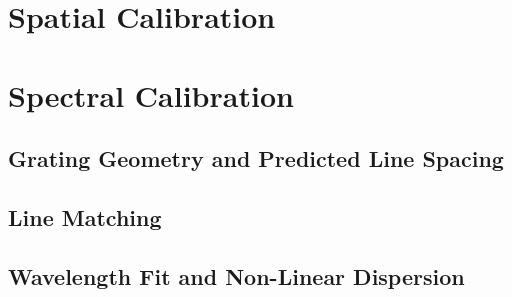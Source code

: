 
\section{Spatial Calibration}
\label{sec:calib-spatial}


\section{Spectral Calibration}
\label{sec:calib-spectral}

\subsection{Grating Geometry and Predicted Line Spacing}
\label{sec:calib-grating-geometry}


\subsection{Line Matching}
\label{sec:calib-line-matching}


\subsection{Wavelength Fit and Non-Linear Dispersion}
\label{sec:calib-wavelength-fit}

